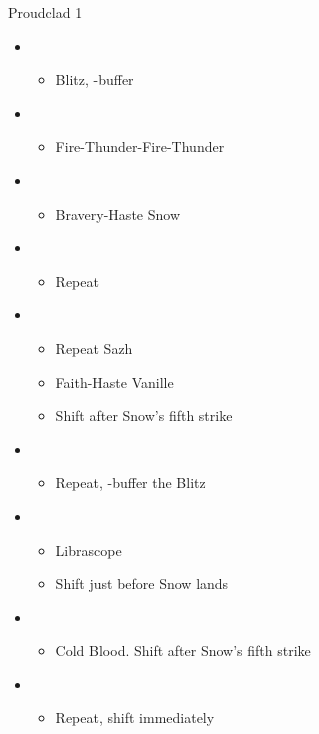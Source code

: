 \begin{battle}[1:31]{Proudclad 1}
	\begin{itemize}
		\item \second
		      \begin{itemize}
			      \item Blitz, \rav-buffer
		      \end{itemize}
		\item \sixth
		      \begin{itemize}
			      \item Fire-Thunder-Fire-Thunder
		      \end{itemize}
		\item \fourth
		      \begin{itemize}
			      \item Bravery-Haste Snow
		      \end{itemize}
		\item \sixth
		      \begin{itemize}
			      \item Repeat
		      \end{itemize}
		\item \fourth
		      \begin{itemize}
			      \item Repeat Sazh
			      \item Faith-Haste Vanille
			      \item Shift after Snow's fifth strike
		      \end{itemize}
		\item \first
		      \begin{itemize}
			      \item Repeat, \rav-buffer the Blitz
		      \end{itemize}
		\item \fifth
		      \begin{itemize}
			      \item Librascope
			      \item Shift just before Snow lands
		      \end{itemize}
		\item \sixth
		      \begin{itemize}
			      \item Cold Blood. Shift after Snow's fifth strike
		      \end{itemize}
		\item \fifth
		      \begin{itemize}
			      \item Repeat, shift immediately

\end{itemize}
\end{itemize}
\end{battle}
